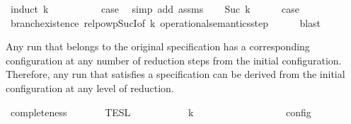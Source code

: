 \begin{isabellebody}
%
\isadelimproof
%
\endisadelimproof
%
\isatagproof
{}\isamarkupfalse%
\ {\isacharparenleft}induct\ k{\isacharparenright}\isanewline
\ \ \isamarkupfalse%
\ {}\isanewline
\ \ \ \ \isamarkupfalse%
\ {\isacharquery}case\ \isamarkupfalse%
\ {\isacharparenleft}simp\ add{\isacharcolon}\ assms{\isacharparenright}\isanewline
{}\isamarkupfalse%
\isanewline
\ \ \isamarkupfalse%
\ {\isacharparenleft}Suc\ k{\isacharparenright}\isanewline
\ \ \ \ \isamarkupfalse%
\ {\isacharquery}case\isanewline
\ \ \ \ \ \ \isamarkupfalse%
\ branch{\isacharunderscore}existence\ relpowp{\isacharunderscore}Suc{\isacharunderscore}I{\isacharbrackleft}of\ {\isacartoucheopen}k{\isacartoucheclose}\ {\isacartoucheopen}operational{\isacharunderscore}semantics{\isacharunderscore}step{\isacartoucheclose}{\isacharbrackright}\isanewline
\ \ \ \ \isamarkupfalse%
\ blast\isanewline
{}\isamarkupfalse%
%
\endisatagproof
{\isafoldproof}%
%
\isadelimproof
%
\endisadelimproof
%
\begin{isamarkuptext}%
Any run that belongs to the original specification \isa{{\isasymPsi}} has a corresponding 
  configuration \isa{{\isasymS}} at any number  of reduction steps
  from the initial configuration. Therefore, any run that satisfies a specification
  can be derived from the initial configuration at any level of reduction.%
\end{isamarkuptext}\isamarkuptrue%
\isamarkupfalse%
\ completeness{\isacharcolon}\isanewline
\ \ \ {\isacartoucheopen}{\isasymrho}\ {\isasymin}\ {\isasymlbrakk}{\isasymlbrakk}\ {\isasymPsi}\ {\isasymrbrakk}{\isasymrbrakk}\isactrlsub T\isactrlsub E\isactrlsub S\isactrlsub L{\isacartoucheclose}\isanewline
\ \ \ {\isacartoucheopen}{\isasymexists}{\isasymS}{\isachardot}\ {\isacharparenleft}{\isacharparenleft}{\isacharbrackleft}{\isacharbrackright}{\isacharcomma}\ {}\ {\isasymturnstile}\ {\isasymPsi}\ {\isasymtriangleright}\ {\isacharbrackleft}{\isacharbrackright}{\isacharparenright}\ \ {\isasymhookrightarrow}\isactrlbsup k\isactrlesup \ \ {\isasymS}{\isacharparenright}\isanewline
\ \ \ \ \ \ \ \ \ \ \ {\isasymand}\ {\isasymrho}\ {\isasymin}\ {\isasymlbrakk}\ {\isasymS}\ {\isasymrbrakk}\isactrlsub c\isactrlsub o\isactrlsub n\isactrlsub f\isactrlsub i\isactrlsub g{\isacartoucheclose}\isanewline
%
\isadelimproof
\ \ %
\endisadelimproof
%
\isatagproof
{}\isamarkupfalse%

\end{isabellebody}
